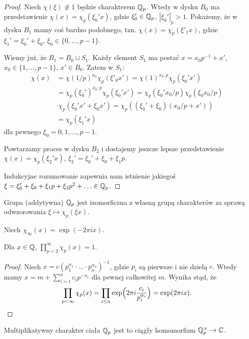 \begin{proof}
	Niech $\chi(\xi) \not \equiv 1$ będzie charakterem $\mathbb Q_p$.
	Wtedy w dysku $B_0$ ma przedstawienie $\chi(x) = \chi_p(\xi_0'x)$, gdzie $\xi_0' \in \mathbb Q_p$, $|\xi_0'|_p > 1$.
	Pokażemy, że w dysku $B_1$ mamy coś bardzo podobnego, tzn. $\chi (x) = \chi_p(\xi'_1 x)$, gdzie $\xi_1' = \xi_0' + \xi_0$, $\xi_0 \in \{0, \ldots, p-1\}$.

	Wiemy już, że $B_1 = B_0 \sqcup S_1$.
	Każdy element $S_1$ ma postać $x = x_0 p^{-1} + x'$, $x_0 \in \{1, \ldots, p-1\}$, $x' \in B_0$.
	Zatem w $S_1$:
	\begin{align*}
		\chi(x) & = \chi(1/p)^{x_0} \chi_p (\xi'_0 x') = \chi(1)^{x_0 : p} \chi_p (\xi_0' x') \\
		& = \chi_p(\xi_0')^{x_0 : p} \chi_p (\xi_0' x') = \chi_p(\xi_0' x_0 / p) \chi_p(\xi_0 x_0 / p) \\ & \cdot \chi_p(\xi_0' x' + \xi_0 x') = \chi_p((\xi_0' + \xi_0)(x_0 / p + x')) \\
		& = \chi_p (\xi_1' x)
	\end{align*}
	dla pewnego $\xi_0 = 0, 1, \ldots, p-1$.

	Powtarzamy proces w dysku $B_2$ i dostajemy jeszcze lepsze przedstawienie $\chi(x) = \chi_p(\xi_2' x)$, $\xi_2' = \xi_0' + \xi_0 + \xi_1 p$.

	Indukcyjne rozumowanie zapewnia nam istnienie jakiegoś $\xi = \xi_0' + \xi_0 + \xi_1 p + \xi_2 p^2 + \ldots \in \mathbb Q_p$.
\end{proof}

\begin{wniosek}
	Grupa (addytywna) $\mathbb Q_p$ jest izomorficzna z własną grupą charakterów za sprawą odwzorowania $\xi \mapsto \chi_p(\xi x)$.
\end{wniosek}

Niech $\chi_\infty(x) = \exp(- 2 \pi i x)$.

\begin{fakt}[,,adelizm'']
	Dla $x \in \mathbb Q$, $\prod_{p = 2}^\infty \chi_p(x) = 1$.
\end{fakt}

\begin{proof}
	Niech $x = c (p_1^{\alpha_1} \cdot \ldots \cdot p_n^{\alpha_n})^{-1}$, gdzie $p_i$ są pierwsze i nie dzielą $c$.
	Wtedy mamy $x = m + \sum_{i=1}^{n} c_ip^{-\alpha_i}$ dla pewnej całkowitej $m$.
	Wynika stąd, że
	\[
		\prod_{p < \infty} \chi_p(x) = \prod_{i \le n} \exp \Bigl(2 \pi i \frac{c_i}{p_i^{\alpha_i}} \Bigr) = \exp (2 \pi i x). \qedhere
	\]
\end{proof}

\begin{definicja}
	Multiplikatywny charakter ciała $\mathbb Q_p$ jest to ciągły homomorfizm $\mathbb Q_p^\times \to \mathbb C$. %
\end{definicja}

